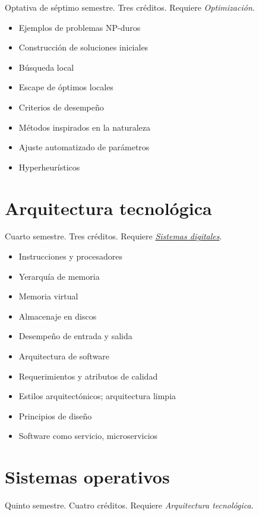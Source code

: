 \documentclass{article}
\begin{document}
\begin{multicols}{4}
Optativa de s\'{e}ptimo semestre. Tres cr\'{e}ditos. Requiere {\em Optimizaci\'{o}n}.

\begin{itemize}
\item{Ejemplos de problemas NP-duros}  
\item{Construcci\'{o}n de soluciones iniciales}
\item{B\'{u}squeda local}
\item{Escape de \'{o}ptimos locales}
\item{Criterios de desempe\~{n}o}  
\item{M\'{e}todos inspirados en la naturaleza}
\item{Ajuste automatizado de par\'{a}metros}
\item{Hyperheur\'{i}sticos}
\end{itemize}

\newpage

\hypertarget{at}{\section*{Arquitectura tecnol\'{o}gica}} 

Cuarto semestre. Tres cr\'{e}ditos. Requiere \hyperlink{sd}{\em Sistemas digitales}.

\begin{itemize}
\item{Instrucciones y procesadores}
\item{Yerarqu\'{i}a de memoria}
\item{Memoria virtual}
\item{Almacenaje en discos}
\item{Desempe\~{n}o de entrada y salida}
\item{Arquitectura de software}
\item{Requerimientos y atributos de calidad}
\item{Estilos arquitect\'{o}nicos; arquitectura limpia}
\item{Principios de dise\~{n}o}
\item{Software como servicio, microservicios}
\end{itemize}

\vfill\null \columnbreak

\hypertarget{so}{\section*{Sistemas operativos}}  

Quinto semestre. Cuatro cr\'{e}ditos. Requiere {\em Arquitectura tecnol\'{o}gica}.


\end{multicols}
\end{document}
